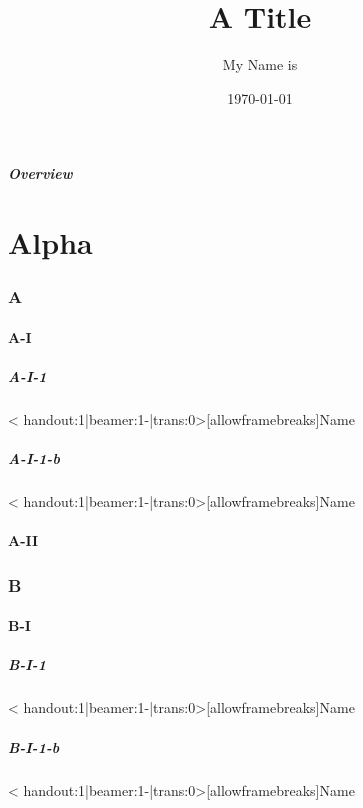 \documentclass{beamer}[10]
\title{A Title}
\author{My Name is}
\institute{I work at}
\date{\today}
\begin{document}
\frame{\titlepage \vspace{-0.5cm}
}

\frame
{
\frametitle{Overview}
\tableofcontents%
}

\part{Alpha}
\section{A}
    \subsection{A-I}
        \subsubsection{A-I-1}
            \begin{frame}< handout:1|beamer:1-|trans:0>[allowframebreaks]{Name}{\subsubsecname}	  \end{frame}

        \subsubsection{A-I-1-b}
                    \begin{frame}< handout:1|beamer:1-|trans:0>[allowframebreaks]{Name}{\subsubsecname}	\end{frame}
    \subsection{A-II}

\section{B}
    \subsection{B-I}
        \subsubsection{B-I-1}
                    \begin{frame}< handout:1|beamer:1-|trans:0>[allowframebreaks]{Name}{\subsubsecname}	\end{frame}
        \subsubsection{B-I-1-b}
                    \begin{frame}< handout:1|beamer:1-|trans:0>[allowframebreaks]{Name}{\subsubsecname}	\end{frame}
\end{document}

